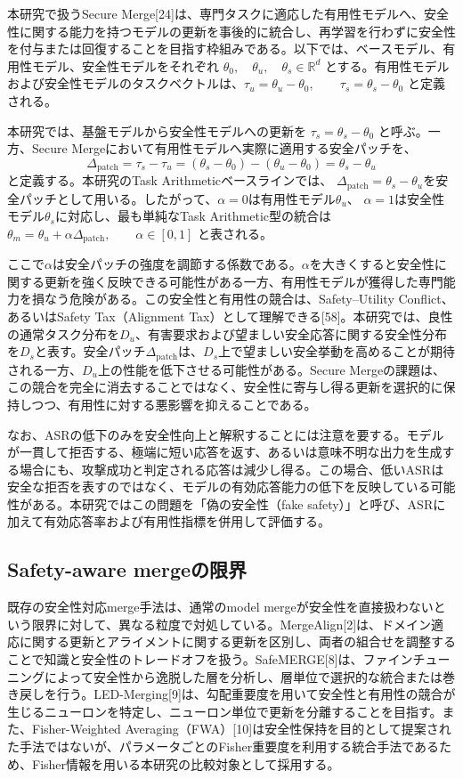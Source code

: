 \documentclass{article}
\begin{document}
本研究で扱うSecure Merge[24]は、専門タスクに適応した有用性モデルへ、安全性に関する能力を持つモデルの更新を事後的に統合し、再学習を行わずに安全性を付与または回復することを目指す枠組みである。以下では、ベースモデル、有用性モデル、安全性モデルをそれぞれ \(\theta_0,\quad \theta_u,\quad \theta_s \in \mathbb{R}^d\) とする。有用性モデルおよび安全性モデルのタスクベクトルは、\(\tau_u = \theta_u - \theta_0,\qquad \tau_s = \theta_s - \theta_0\) と定義される。

本研究では、基盤モデルから安全性モデルへの更新を \(\tau_s=\theta_s-\theta_0\) と呼ぶ。一方、Secure Mergeにおいて有用性モデルへ実際に適用する安全パッチを、
\[
\Delta_{\mathrm{patch}} = \tau_s - \tau_u = (\theta_s - \theta_0) - (\theta_u - \theta_0) = \theta_s-\theta_u
\]
と定義する。本研究のTask Arithmeticベースラインでは、 \(\Delta_{\mathrm{patch}}=\theta_s-\theta_u\)を安全パッチとして用いる。したがって、\(\alpha=0\)は有用性モデル\(\theta_u\)、 \(\alpha=1\)は安全性モデル\(\theta_s\)に対応し、最も単純なTask Arithmetic型の統合は \(\theta_m = \theta_u + \alpha \Delta_{\mathrm{patch}},\qquad \alpha \in [0,1]\) と表される。

ここで\(\alpha\)は安全パッチの強度を調節する係数である。\(\alpha\)を大きくすると安全性に関する更新を強く反映できる可能性がある一方、有用性モデルが獲得した専門能力を損なう危険がある。この安全性と有用性の競合は、Safety--Utility Conflict、あるいはSafety Tax（Alignment Tax）として理解できる[58]。本研究では、良性の通常タスク分布を\(D_u\)、有害要求および望ましい安全応答に関する安全性分布を\(D_s\)と表す。安全パッチ\(\Delta_{\mathrm{patch}}\)は、\(D_s\)上で望ましい安全挙動を高めることが期待される一方、\(D_u\)上の性能を低下させる可能性がある。Secure Mergeの課題は、この競合を完全に消去することではなく、安全性に寄与し得る更新を選択的に保持しつつ、有用性に対する悪影響を抑えることである。

なお、ASRの低下のみを安全性向上と解釈することには注意を要する。モデルが一貫して拒否する、極端に短い応答を返す、あるいは意味不明な出力を生成する場合にも、攻撃成功と判定される応答は減少し得る。この場合、低いASRは安全な拒否を表すのではなく、モデルの有効応答能力の低下を反映している可能性がある。本研究ではこの問題を「偽の安全性（fake safety）」と呼び、ASRに加えて有効応答率および有用性指標を併用して評価する。

\subsection{Safety-aware mergeの限界}
既存の安全性対応merge手法は、通常のmodel mergeが安全性を直接扱わないという限界に対して、異なる粒度で対処している。MergeAlign[2]は、ドメイン適応に関する更新とアライメントに関する更新を区別し、両者の組合せを調整することで知識と安全性のトレードオフを扱う。SafeMERGE[8]は、ファインチューニングによって安全性から逸脱した層を分析し、層単位で選択的な統合または巻き戻しを行う。LED-Merging[9]は、勾配重要度を用いて安全性と有用性の競合が生じるニューロンを特定し、ニューロン単位で更新を分離することを目指す。また、Fisher-Weighted Averaging（FWA）[10]は安全性保持を目的として提案された手法ではないが、パラメータごとのFisher重要度を利用する統合手法であるため、Fisher情報を用いる本研究の比較対象として採用する。
\end{document}
